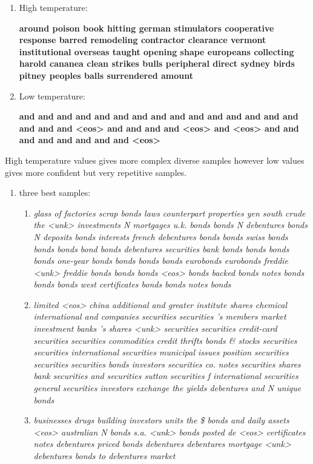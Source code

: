 \begin{enumerate}
\begin{enumerate}
	\item
	High temperature: 
	
	\textbf{around poison book hitting german stimulators cooperative response barred remodeling contractor clearance vermont institutional overseas taught opening shape europeans collecting harold cananea clean strikes bulls peripheral direct sydney birds pitney peoples balls surrendered amount}
	
	\item 
	Low temperature:
	
	\textbf{and and and and and and and and and and and and and and and and and and <eos> and and and and <eos> and <eos> and and and and and and and and <eos>}	
	
\end{enumerate}

High temperature values gives more complex diverse samples however low values gives more confident but very repetitive samples. 

\begin{enumerate}
	\item three best samples:
	\begin{enumerate}
		\item 
		\textit{glass of factories scrap bonds laws counterpart properties yen south crude the <unk> investments N mortgages u.k. bonds bonds N debentures bonds N deposits bonds interests french debentures bonds bonds swiss bonds bonds bonds bond bonds debentures securities bank bonds bonds bonds bonds one-year bonds bonds bonds bonds eurobonds eurobonds freddie <unk> freddie bonds bonds bonds <eos> bonds backed bonds notes bonds bonds bonds west certificates bonds bonds notes bonds
		}
	
	
		\item 
		\textit{limited <eos> china additional and greater institute shares chemical international and companies securities securities 's members market investment banks 's shares <unk> securities securities credit-card securities securities commodities credit thrifts bonds \& stocks securities securities international securities municipal issues position securities securities securities bonds investors securities co. notes securities shares bank securities and securities sutton securities f international securities general securities investors exchange the yields debentures and N unique bonds}
		
		\item 
		\textit{
		businesses drugs building investors units the \$ bonds and daily assets <eos> australian N bonds s.a. <unk> bonds posted de <eos> certificates notes debentures priced bonds debentures debentures mortgage <unk> debentures bonds to debentures market}
		

\end{enumerate}
\end{enumerate}
\end{enumerate}
